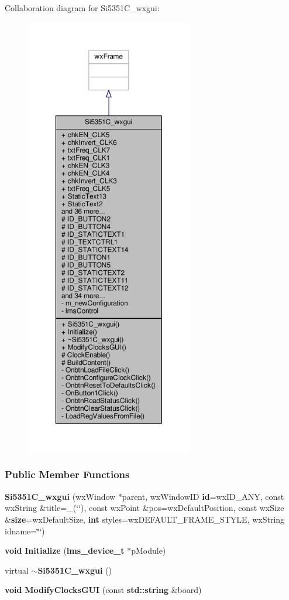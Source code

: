 Collaboration diagram for Si5351\+C\+\_\+wxgui\+:
\nopagebreak
\begin{figure}[H]
\begin{center}
\leavevmode
\includegraphics[height=550pt]{d0/ddf/classSi5351C__wxgui__coll__graph}
\end{center}
\end{figure}
\subsubsection*{Public Member Functions}
\begin{DoxyCompactItemize}
\item 
{\bf Si5351\+C\+\_\+wxgui} (wx\+Window $\ast$parent, wx\+Window\+ID {\bf id}=wx\+I\+D\+\_\+\+A\+NY, const wx\+String \&title=\+\_\+(\char`\"{}\char`\"{}), const wx\+Point \&pos=wx\+Default\+Position, const wx\+Size \&{\bf size}=wx\+Default\+Size, {\bf int} styles=wx\+D\+E\+F\+A\+U\+L\+T\+\_\+\+F\+R\+A\+M\+E\+\_\+\+S\+T\+Y\+LE, wx\+String idname=\char`\"{}\char`\"{})
\item 
{\bf void} {\bf Initialize} ({\bf lms\+\_\+device\+\_\+t} $\ast$p\+Module)
\item 
virtual {\bf $\sim$\+Si5351\+C\+\_\+wxgui} ()
\item 
{\bf void} {\bf Modify\+Clocks\+G\+UI} (const {\bf std\+::string} \&board)
\end{DoxyCompactItemize}
